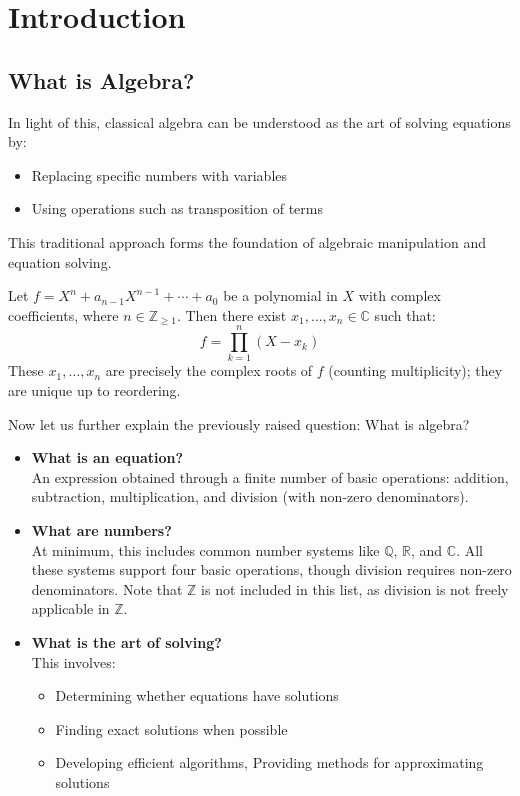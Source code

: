 \chapter{Introduction}

\section{What is Algebra?}

In light of this, classical algebra can be understood as the art of solving equations by:
\begin{itemize}
  \item Replacing specific numbers with variables
  \item Using operations such as transposition of terms
\end{itemize}

This traditional approach forms the foundation of algebraic manipulation and equation solving.

\begin{theorem}
  Let $f = X^n + a_{n-1}X^{n-1} + \cdots + a_0$ be a polynomial in $X$ with complex coefficients, where $n \in \mathbb{Z}_{\geq 1}$. Then there exist $x_1,\ldots,x_n \in \mathbb{C}$ such that:
  \[
    f = \prod_{k=1}^n (X-x_k)
  \]
  These $x_1,\ldots,x_n$ are precisely the complex roots of $f$ (counting multiplicity); they are unique up to reordering.
\end{theorem}

Now let us further explain the previously raised question: What is algebra?

\begin{itemize}
  \item \textbf{What is an equation?} \\
    An expression obtained through a finite number of basic operations: addition, subtraction, multiplication, and division (with non-zero denominators).

  \item \textbf{What are numbers?} \\
    At minimum, this includes common number systems like $\mathbb{Q}$, $\mathbb{R}$, and $\mathbb{C}$. All these systems support four basic operations, though division requires non-zero denominators. Note that $\mathbb{Z}$ is not included in this list, as division is not freely applicable in $\mathbb{Z}$.

  \item \textbf{What is the art of solving?} \\
    This involves:
    \begin{itemize}
      \item Determining whether equations have solutions
      \item Finding exact solutions when possible
      \item Developing efficient algorithms, Providing methods for approximating solutions
    \end{itemize}
\end{itemize}